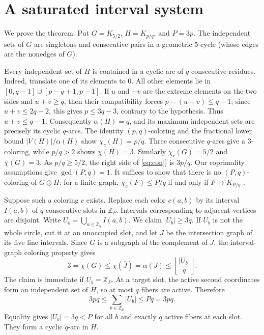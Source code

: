 \documentclass[11pt]{article}
\newcommand{\Z}{\mathbb Z}
\newcommand{\cc}{\chi_c}
\begin{document}
\section{A saturated interval system}
We prove the theorem.  Put $G=K_{5/2}$, $H=K_{p/q}$, and $P=3p$.
The independent sets of $G$ are singletons and consecutive pairs in a
geometric $5$-cycle (whose edges are the nonedges of $G$).

Every independent set of $H$ is contained in a cyclic arc of $q$
consecutive residues.  Indeed, translate one of its elements to $0$.
All other elements lie in $[0,q-1]\cup[p-q+1,p-1]$.  If $u$ and $-v$
are the extreme elements on the two sides and $u+v\geq q$, then their
compatibility forces $p-(u+v)\leq q-1$; since $u+v\leq2q-2$, this gives
$p\leq3q-3$, contrary to the hypothesis.  Thus $u+v\leq q-1$.
Consequently $\alpha(H)=q$, and its maximum independent sets are
precisely its cyclic $q$-arcs.  The identity $(p,q)$-coloring and the
fractional lower bound $|V(H)|/\alpha(H)$ show $\cc(H)=p/q$.
Three consecutive $q$-arcs give a $3$-coloring, while $p/q>2$ shows
$\chi(H)=3$.  Similarly $\cc(G)=5/2$ and $\chi(G)=3$.  As $p/q\geq5/2$,
the right side of \eqref{eq:conj} is $3p/q$.  Our coprimality assumptions
give $\gcd(P,q)=1$.  It suffices to show that there is no $(P,q)$-coloring
of $G\oplus H$: for a finite graph, $\cc(F)\leq P/q$ if and only if
$F\to K_{P/q}$ \cite{LiuZhu2008}.

Suppose such a coloring $c$ exists.  Replace each color $c(a,b)$ by its
interval $I(a,b)$ of $q$ consecutive slots in $\Z_P$.  Intervals
corresponding to adjacent vertices are disjoint.  Write
$U_b=\bigcup_{a\in\Z_5}I(a,b)$.  We claim $|U_b|\geq3q$.
If $U_b$ is not the whole circle, cut it at an unoccupied slot, and let
$J$ be the intersection graph of its five line intervals.  Since $G$
is a subgraph of the complement of $J$, the interval-graph coloring
property gives
\[
 3=\chi(G)\leq\chi(\overline J)=\alpha(J)
 \leq\left\lfloor\frac{|U_b|}{q}\right\rfloor.
\]
The claim is immediate if $U_b=\Z_P$.  At a target slot, the active
second coordinates form an independent set of $H$, so at most $q$ fibers
are active.  Therefore
\begin{equation}\label{eq:occupancy}
 3pq\leq\sum_{b\in\Z_p}|U_b|\leq Pq=3pq.
\end{equation}
Equality gives $|U_b|=3q<P$ for all $b$ and exactly $q$ active fibers
at each slot.  They form a cyclic $q$-arc in $H$.
\end{document}
